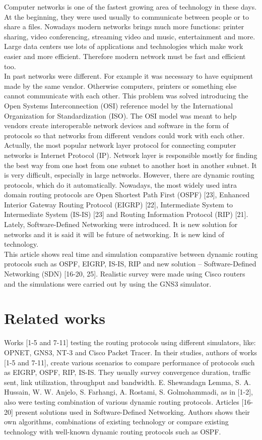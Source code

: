 \documentclass[conference,compsoc]{IEEEtran}
\begin{document}
Computer networks is one of the fastest growing area of technology in these days. At the beginning, they were used usually to communicate between people or to share a files. Nowadays modern networks brings much more functions: printer sharing, video conferencing, streaming video and music, entertainment and more. Large data centers use lots of applications and technologies which make work easier and more efficient. Therefore modern network must be fast and efficient too.
\\ \indent In past networks were different. For example it was necessary to have equipment made by the same vendor. Otherwise computers, printers or something else cannot communicate with each other. This problem was solved introducing the Open Systems Interconnection (OSI) reference model by the International Organization for Standardization (ISO). The OSI model was meant to help vendors create interoperable network devices and software in the form of protocols so that networks from different vendors could work with each other.
\\ \indent Actually, the most popular network layer protocol for connecting computer networks is Internet Protocol (IP). Network layer is responsible mostly for finding the best way from one host from one subnet to another host in another subnet. It is very difficult, especially in large networks. However, there are dynamic routing protocols, which do it automatically. Nowadays, the most widely used intra domain routing protocols are Open Shortest Path First (OSPF) [23], Enhanced Interior Gateway Routing Protocol (EIGRP) [22], Intermediate System to Intermediate System (IS-IS) [23] and Routing Information Protocol (RIP) [21]. Lately, Software-Defined Networking were introduced. It is new solution for networks and it is said it will be future of networking. It is new kind of technology.
\\ \indent This article shows real time and simulation comparative between dynamic routing protocols such as OSPF, EIGRP, IS-IS, RIP and new solution – Software-Defined Networking (SDN) [16-20, 25]. Realistic survey were made using Cisco routers and the simulations were carried out by using the GNS3 simulator.


\section{Related works}

Works [1-5 and 7-11] testing the routing protocols using different simulators, like: OPNET, GNS3, NT-3 and Cisco Packet Tracer. In their studies, authors of works [1-5 and 7-11], create various scenarios to compare performance of protocols such as EIGRP, OSPF, RIP, IS-IS. They usually survey convergence duration, traffic sent, link utilization, throughput and bandwidth. E. Shewandagn Lemma, S. A. Hussain, W. W. Anjelo, S. Farhangi, A. Rostami, S. Golmohammadi, as in [1-2], also were testing combination of various dynamic routing protocols. Articles [16-20] present solutions used in Software-Defined Networking. Authors shows their own algorithms, combinations of existing technology or compare existing technology with well-known dynamic routing protocols such as OSPF.
\end{document}
